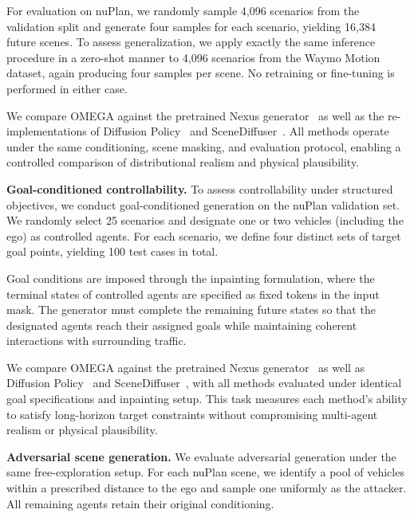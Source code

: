 \documentclass[10pt,twocolumn,letterpaper]{article}
\theoremstyle{plain}
\theoremstyle{remark}
\renewcommand{\paragraph}[1]{\vspace{.5em}\noindent\textbf{#1.}}
\begin{document}
For evaluation on nuPlan, we randomly sample 4{,}096 scenarios
from the validation split and generate four samples for each
scenario, yielding 16{,}384 future scenes.  
To assess generalization, we apply exactly the same inference
procedure in a zero-shot manner to 4{,}096 scenarios from the
Waymo Motion dataset, again producing four samples per scene.
No retraining or fine-tuning is performed in either case.

We compare OMEGA against the pretrained Nexus generator~\cite{zhou2025decoupled} as well as the re-implementations of Diffusion Policy~\cite{chi2025diffusion}
and SceneDiffuser~\cite{jiang2024scenediffuser}.  
All methods operate under the same conditioning, scene masking,
and evaluation protocol, enabling a controlled comparison of
distributional realism and physical plausibility.

\paragraph{Goal-conditioned controllability}
To assess controllability under structured objectives, we conduct goal-conditioned generation on the nuPlan validation set. We randomly select 25 scenarios and designate one or two vehicles (including the ego) as controlled agents. For each scenario, we define four distinct sets of target goal points, yielding 100 test cases in total.

Goal conditions are imposed through the inpainting formulation,
where the terminal states of controlled agents are specified as
fixed tokens in the input mask. The generator must complete the
remaining future states so that the designated agents reach their assigned goals while maintaining coherent interactions with surrounding traffic.

We compare OMEGA against the pretrained Nexus generator~\cite{zhou2025decoupled} as well as Diffusion Policy~\cite{chi2025diffusion} and SceneDiffuser~\cite{jiang2024scenediffuser}, with all methods
evaluated under identical goal specifications and inpainting
setup. This task measures each method's ability to satisfy long-horizon target constraints without compromising multi-agent realism or physical plausibility.

\paragraph{Adversarial scene generation}
We evaluate adversarial generation under the same free-exploration
setup.  
For each nuPlan scene, we identify a pool of vehicles within a
prescribed distance to the ego and sample one uniformly as the
attacker. All remaining agents
retain their original conditioning.
\end{document}
